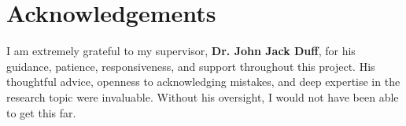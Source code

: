﻿\section*{Acknowledgements}
I am extremely grateful to my supervisor, \textbf{Dr. John Jack Duff}, for his guidance, patience, responsiveness, and support throughout this project. His thoughtful advice, openness to acknowledging mistakes, and deep expertise in the research topic were invaluable. Without his oversight, I would not have been able to get this far.